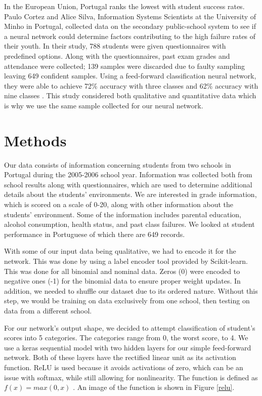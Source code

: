 \documentclass[conference]{IEEEtran}
\begin{document}
 In the European Union, Portugal ranks the lowest with student success rates. Paulo Cortez and Alice Silva, Information Systems Scientists at the University of Minho in Portugal, collected data on the secondary public-school system to see if a neural network could determine factors contributing to the high failure rates of their youth. In their study, 788 students were given questionnaires with predefined options. Along with the questionnaires, past exam grades and attendance were collected; 139 samples were discarded due to faulty sampling leaving 649 confident samples. Using a feed-forward classification neural network, they were able to achieve 72\% accuracy with three classes and 62\% accuracy with nine classes \cite{cortez2008}. This study considered both qualitative and quantitative data which is why we use the same sample collected for our neural network. 

\section{Methods}

Our data consists of information concerning students from two schools in Portugal during the 2005-2006 school year. Information was collected both from school results along with questionnaires, which are used to determine additional details about the students’ environments. We are interested in grade information, which is scored on a scale of 0-20, along with other information about the students’ environment. Some of the information includes parental education, alcohol consumption, health status, and past class failures. We looked at student performance in Portuguese of which there are 649 records. 

With some of our input data being qualitative, we had to encode it for the network. This was done by using a label encoder tool provided by Scikit-learn. This was done for all binomial and nominal data. Zeros (0) were encoded to negative ones (-1) for the binomial data to ensure proper weight updates. In addition, we needed to shuffle our dataset due to its ordered nature. Without this step, we would be training on data exclusively from one school, then testing on data from a different school. 

For our network’s output shape, we decided to attempt classification of student’s scores into 5 categories. The categories range from 0, the worst score, to 4. We use a keras sequential model with two hidden layers for our simple feed-forward network. Both of these layers have the rectified linear unit as its activation function. ReLU is used because it avoids activations of zero, which can be an issue with softmax, while still allowing for nonlinearity. The function is defined as $f(x) = max(0,x)$ \cite{kaggle}. An image of the function is shown in Figure \ref{relu}.
\end{document}
